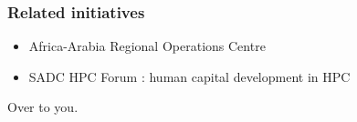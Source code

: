 \documentclass[handout]{beamer}
\begin{document}
\begin{frame}
\frametitle{Related initiatives}
\begin{itemize}
  \item Africa-Arabia Regional Operations Centre
  \pause
  \item SADC HPC Forum : human capital development in HPC
\end{itemize}
\end{frame}

\begin{frame}[plain,c]
\begin{center}
\Huge{Over to you.}
\end{center}
\end{frame}

\end{document}
